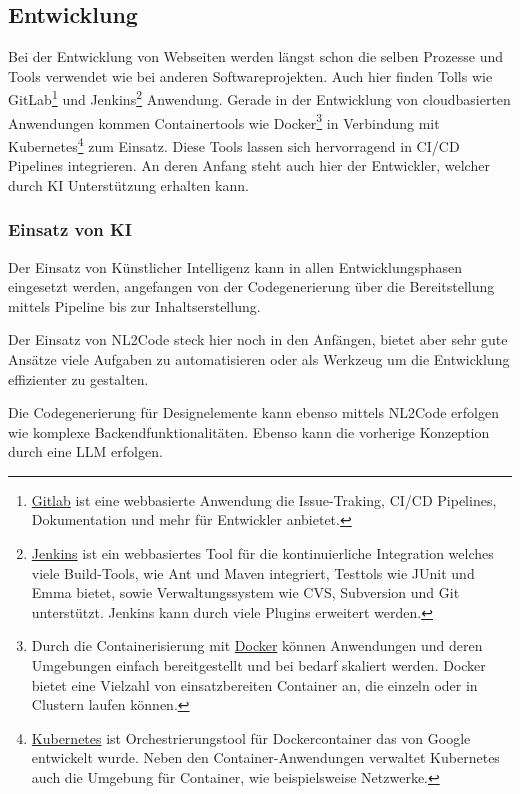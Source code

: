 \subsection{Entwicklung}
Bei der Entwicklung von Webseiten werden längst schon die selben Prozesse und Tools verwendet wie bei anderen Softwareprojekten. Auch hier finden Tolls wie GitLab\footnote{\href{https://about.gitlab.com/}{Gitlab} ist eine webbasierte Anwendung die Issue-Traking, CI/CD Pipelines, Dokumentation und mehr für Entwickler anbietet.} und Jenkins\footnote{\href{https://www.jenkins.io/}{Jenkins} ist ein webbasiertes Tool für die kontinuierliche Integration welches viele Build-Tools, wie Ant und Maven integriert, Testtols wie JUnit und Emma bietet, sowie Verwaltungssystem wie CVS, Subversion und Git unterstützt. Jenkins kann durch viele Plugins erweitert werden.} Anwendung. Gerade in der Entwicklung von cloudbasierten Anwendungen kommen Containertools wie Docker\footnote{Durch die Containerisierung mit \href{https://www.docker.com/}{Docker} können Anwendungen und deren Umgebungen einfach bereitgestellt und bei bedarf skaliert werden. Docker bietet eine Vielzahl von einsatzbereiten Container an, die einzeln oder in Clustern laufen können.} in Verbindung mit Kubernetes\footnote{\href{https://kubernetes.io/}{Kubernetes} ist  Orchestrierungstool für Dockercontainer das von Google entwickelt wurde. Neben den Container-Anwendungen verwaltet Kubernetes auch die Umgebung für Container, wie beispielsweise Netzwerke.} zum Einsatz. Diese Tools lassen sich hervorragend in CI/CD Pipelines integrieren. An deren Anfang steht auch hier der Entwickler, welcher durch KI Unterstützung erhalten kann.


\subsubsection{Einsatz von KI}
Der Einsatz von Künstlicher Intelligenz kann in allen Entwicklungsphasen eingesetzt werden, angefangen von der Codegenerierung über die Bereitstellung mittels Pipeline bis zur Inhaltserstellung.\vspace{0.2cm}

Der Einsatz von NL2Code steck hier noch in den Anfängen, bietet aber sehr gute Ansätze viele Aufgaben zu automatisieren oder als Werkzeug um die Entwicklung effizienter zu gestalten.\vspace{0.2cm}

Die Codegenerierung für Designelemente kann ebenso mittels NL2Code erfolgen wie komplexe Backendfunktionalitäten. Ebenso kann die vorherige Konzeption durch eine LLM erfolgen.

